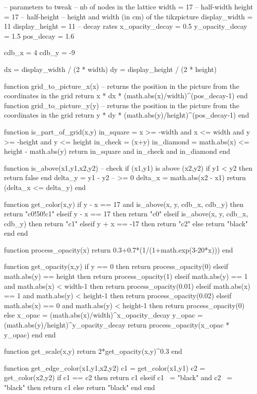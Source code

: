 \begin{luacode}
-- parameters to tweak
-- nb of nodes in the lattice
width = 17 -- half-width
height = 17 -- half-height
-- height and width (in cm) of the tikzpicture
display_width = 11
display_height = 11
-- decay rates 
x_opacity_decay = 0.5
y_opacity_decay = 1.5
pos_decay = 1.6

cdb_x = 4
cdb_y = -9

dx = display_width / (2 * width)
dy = display_height / (2 * height)

function grid_to_picture_x(x)
	-- returns the position in the picture from the coordinates in the grid
	return x * dx * (math.abs(x)/width)^(pos_decay-1)
end 
function grid_to_picture_y(y)
	-- returns the position in the picture from the coordinates in the grid
	return y * dy * (math.abs(y)/height)^(pos_decay-1)
end

function is_part_of_grid(x,y)
	in_square = x >= -width and x <= width and y >= -height and y <= height
	in_check = (x+y)%
	in_diamond = math.abs(x) <= height - math.abs(y)
	return in_square and in_check and in_diamond
end

function is_above(x1,y1,x2,y2) -- check if (x1,y1) is above (x2,y2)
	if y1 < y2 then
		return false
	end
	delta_y = y1 - y2 -- >= 0
	delta_x = math.abs(x2 - x1)
	return (delta_x <= delta_y)
end

function get_color(x,y)
	if y - x == 17 and is_above(x, y, cdb_x, cdb_y) then
		return "c0!50!c1"
	elseif y - x == 17 then
		return "c0"
	elseif is_above(x, y, cdb_x, cdb_y) then
		return "c1"
	elseif y + x == -17 then
		return "c2"
	else
		return "black" 
	end
end

function process_opacity(x)
	return 0.3+0.7*(1/(1+math.exp(3-20*x)))
end

function get_opacity(x,y)
	if y == 0 then
		return process_opacity(0)
	elseif math.abs(y) == height then
		return process_opacity(1)
	elseif math.abs(y) == 1 and math.abs(x) < width-1 then
		return process_opacity(0.01)
	elseif math.abs(x) == 1 and math.abs(y) < height-1 then
		return process_opacity(0.02)
	elseif math.abs(x) == 0 and math.abs(y) < height-1 then
		return process_opacity(0)
	else
		x_opac = (math.abs(x)/width)^x_opacity_decay
		y_opac = (math.abs(y)/height)^y_opacity_decay
		return process_opacity(x_opac * y_opac)
	end
end

function get_scale(x,y)
	return 2*get_opacity(x,y)^0.3
end

function get_edge_color(x1,y1,x2,y2)
	c1 = get_color(x1,y1)
	c2 = get_color(x2,y2)
	if c1 == c2 then
		return c1
	elseif c1 ~= "black" and c2 ~= "black" then
		return c1
	else
		return "black"
	end
end


\end{luacode}
